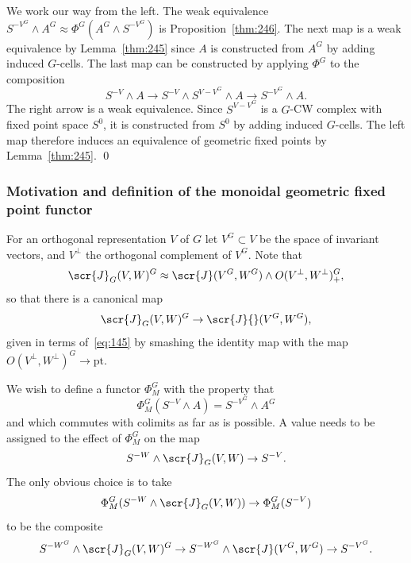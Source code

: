 \documentclass{amsart}
\theoremstyle{definition}
\theoremstyle{remark}
\newenvironment{pf}{\bigskip{\em Proof:\/}}{\qed\medskip}
\newcommand{\gfp}[1]{\Phi^{#1}}
\newcommand{\gfpm}[1]{\Phi_{M}^{#1}}
\newcommand{\phig}{\gfp{G}}
\newcommand{\phigm}{\gfpm{G}}
\newcommand{\icat}{\scr{J}}
\newcommand{\igcat}[1]{\icat_{#1}}
\newcommand{\fixg}[1]{#1^{G}}
\begin{document}
\begin{pf}
We work our way from the left.  The weak equivalence  $S^{-V^{G}}\wedge A^{G}\approx \phig
(A^{G}\wedge S^{-V^{G}})$ is Proposition~\ref{thm:246}.   The next map
is a weak equivalence by Lemma~\ref{thm:245} since $A$ is
constructed from $A^{G}$ by adding induced $G$-cells.   The last map can
be constructed by applying $\phig$ to the composition
\[
S^{-V}\wedge A
\to
S^{-V}\wedge S^{V-V^{G}}\wedge A
\to
S^{-V^{G}}\wedge A.
\]
The right arrow is a weak equivalence.  Since $S^{V-V^{G}}$ is a
$G$-CW complex with fixed point space $S^{0}$, it is constructed from
$S^{0}$ by adding induced $G$-cells.  The left map therefore induces an
equivalence of geometric fixed points by Lemma~\ref{thm:245}.
\end{pf}

\subsubsection{Motivation and definition of the monoidal geometric
fixed point functor}
\label{sec:motivation}

For an orthogonal representation $V$ of $G$ let $\fixg{V}\subset V$ be
the space of invariant vectors, and $V^{\perp}$ the orthogonal
complement of $\fixg{V}$.  Note that
\begin{equation}
\label{eq:145}
\igcat{G}(V,W)^{G} \approx \icat(\fixg{V},\fixg{W})\wedge O(V^{\perp},
W^{\perp})^{G}_{+},
\end{equation}
so that there is a canonical map 
\[
\igcat{G}(V,W)^{G} \to \icat{}(\fixg{V},\fixg{W}),
\]
given in terms of~\eqref{eq:145} by smashing the identity map with the
map $O(V^{\perp}, W^{\perp})^{G}\to \text{pt}$.

We wish to define a functor $\phigm$ with the property that
\begin{equation}
\label{eq:69}
\phigm(S^{-V}\wedge A) = S^{-\fixg{V}}\wedge A^{G}
\end{equation}
and which commutes with colimits as far as is possible.  A value needs
to be assigned to the effect of $\phigm$ on the map
\[
S^{-W}\wedge \igcat{G}(V,W)\to S^{-V}.
\]
The only obvious choice is to take 
\[
\phigm(S^{-W}\wedge \igcat{G}(V,W))\to \phigm(S^{-V})
\]
to be the composite
\begin{equation}
\label{eq:68}
S^{-\fixg{W}}\wedge \igcat{G}(V,W)^{G}  \to
S^{-\fixg{W}}\wedge \icat(\fixg{V},\fixg{W})  \to
S^{-\fixg{V}}.
\end{equation}
\end{document}

